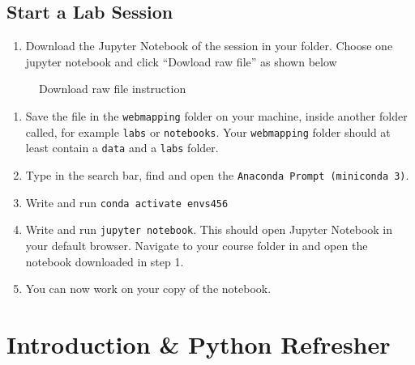 \documentclass[
  letterpaper,
  DIV=11,
  numbers=noendperiod]{scrreprt}
\providecommand{\tightlist}{%
  \setlength{\itemsep}{0pt}\setlength{\parskip}{0pt}}\usepackage{longtable,booktabs,array}
\begin{document}
\section*{Start a Lab Session}\label{start-a-lab-session}


\begin{enumerate}
\def\labelenumi{\arabic{enumi}.}
\tightlist
\item
  Download the Jupyter Notebook of the session in your folder. Choose
  one jupyter notebook and click ``Dowload raw file'' as shown below
\end{enumerate}

\begin{figure}[H]

{\centering 

}

\caption{Download raw file instruction}

\end{figure}%

\begin{enumerate}
\def\labelenumi{\arabic{enumi}.}
\setcounter{enumi}{1}
\tightlist
\item
  Save the file in the \texttt{webmapping} folder on your machine,
  inside another folder called, for example \texttt{labs} or
  \texttt{notebooks}. Your \texttt{webmapping} folder should at least
  contain a \texttt{data} and a \texttt{labs} folder.
\item
  Type in the search bar, find and open the
  \texttt{Anaconda\ Prompt\ (miniconda\ 3)}.
\item
  Write and run \texttt{conda\ activate\ envs456}
\item
  Write and run \texttt{jupyter\ notebook}. This should open Jupyter
  Notebook in your default browser. Navigate to your course folder in
  and open the notebook downloaded in step 1.
\item
  You can now work on your copy of the notebook.
\end{enumerate}


\chapter{Introduction \& Python
Refresher}\label{introduction-python-refresher}
\end{document}
